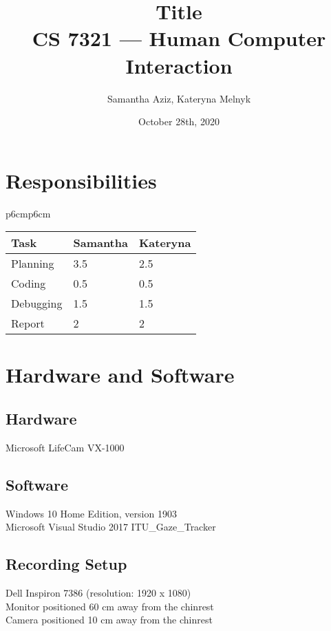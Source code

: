 \documentclass[11pt]{article}
\begin{document}
\title{Title \\ CS 7321 — Human Computer Interaction}
\author{Samantha Aziz, Kateryna Melnyk} 
\date{October 28th, 2020}
\maketitle

\section{Responsibilities} %
    \begin{center}
    \begin{tabular}{p{6cm}p{6cm}}
        \begin{tabular}{lll}
        \toprule
        Task & Samantha & Kateryna \\
        \midrule
        Planning & 3.5 & 2.5 \\
        \midrule
        Coding & 0.5 & 0.5 \\
        \midrule
        Debugging & 1.5 & 1.5 \\
        \midrule
        Report & 2 & 2 \\
        \bottomrule
        \end{tabular}
   \end{tabular}
   \end{center}
   
\section{Hardware and Software} %
\subsection{Hardware} \label{modify}
Microsoft LifeCam VX-1000 \\
\subsection{Software}
Windows 10 Home Edition, version 1903 \\
Microsoft Visual Studio 2017
ITU\_Gaze\_Tracker
\subsection{Recording Setup}
Dell Inspiron 7386 (resolution: 1920 x 1080) \\
Monitor positioned 60 cm away from the chinrest \\
Camera positioned 10 cm away from the chinrest
\end{document}
